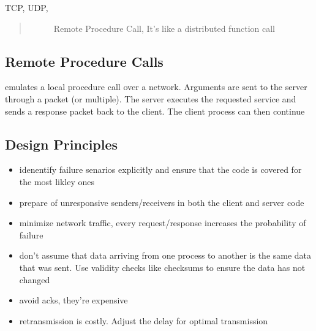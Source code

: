 \documentclass[letterpaper,10pt,english]{sphinxmanual}
\begin{document}
TCP, UDP, 
\begin{quote}\begin{description}
\item[{}] \leavevmode
Remote Procedure Call, It’s like a distributed function call

\end{description}\end{quote}


\subsection{Remote Procedure Calls}
\label{\detokenize{google_article:remote-procedure-calls}}
emulates a local procedure call over a network. Arguments are sent to the
server through a packet (or multiple). The server executes the requested service
and sends a response packet back to the client. The client process can then
continue


\subsection{Design Principles}
\label{\detokenize{google_article:design-principles}}\begin{itemize}
\item {} 
idenentify failure senarios explicitly and ensure that the code is covered for
the most likley ones

\item {} 
prepare of unresponsive senders/receivers in both the client and server code

\item {} 
minimize network traffic, every request/response increases the probability of failure

\item {} 
don’t assume that data arriving from one process to another is the same data that was
sent. Use validity checks like checksums to ensure the data has not changed

\item {} 
avoid acks, they’re expensive

\item {} 
retransmission is costly. Adjust the delay for optimal transmission

\end{itemize}
\end{document}
